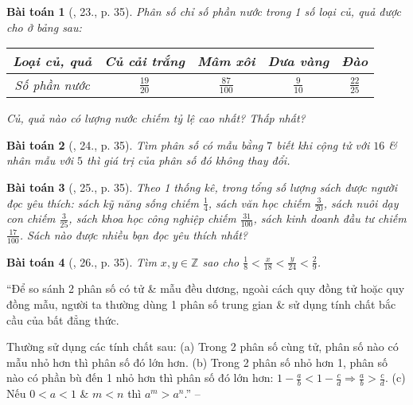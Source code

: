 \documentclass{article}
\newtheorem{baitoan}{Bài toán}
\begin{document}
\begin{baitoan}[\cite{SBT_Toan_6_Canh_Dieu_tap_2}, 23., p. 35]
	Phân số chỉ số phần nước trong 1 số loại củ, quả được cho ở bảng sau:
	\begin{table}[H]
		\centering
		\begin{tabular}{|c|c|c|c|c|}
			\hline
			Loại củ, quả & Củ cải trắng & Mâm xôi & Dưa vàng & Đào \\
			\hline
			Số phần nước & $\frac{19}{20}$ & $\frac{87}{100}$ & $\frac{9}{10}$ & $\frac{22}{25}$ \\
			\hline
		\end{tabular}
	\end{table}
	\noindent Củ, quả nào có lượng nước chiếm tỷ lệ cao nhất? Thấp nhất?
\end{baitoan}

\begin{baitoan}[\cite{SBT_Toan_6_Canh_Dieu_tap_2}, 24., p. 35]
	Tìm phân số có mẫu bằng $7$ biết khi cộng tử với $16$ \& nhân mẫu với $5$ thì giá trị của phân số đó không thay đổi.
\end{baitoan}

\begin{baitoan}[\cite{SBT_Toan_6_Canh_Dieu_tap_2}, 25., p. 35]
	Theo 1 thống kê, trong tổng số lượng sách được người đọc yêu thích: sách kỹ năng sống chiếm $\frac{1}{4}$, sách văn học chiếm $\frac{3}{20}$, sách nuôi dạy con chiếm $\frac{3}{25}$, sách khoa học công nghiệp chiếm $\frac{31}{100}$, sách kinh doanh đầu tư chiếm $\frac{17}{100}$. Sách nào được nhiều bạn đọc yêu thích nhất?
\end{baitoan}

\begin{baitoan}[\cite{SBT_Toan_6_Canh_Dieu_tap_2}, 26., p. 35]
	Tìm $x,y\in\mathbb{Z}$ sao cho $\frac{1}{8} < \frac{x}{18} < \frac{y}{24} < \frac{2}{9}$.
\end{baitoan}

``Để so sánh 2 phân số có tử \& mẫu đều dương, ngoài cách quy đồng tử hoặc quy đồng mẫu, người ta thường dùng 1 phân số trung gian \& sử dụng tính chất bắc cầu của bất đẳng thức.

Thường sử dụng các tính chất sau: (a) Trong 2 phân số cùng tử, phân số nào có mẫu nhỏ hơn thì phân số đó lớn hơn. (b) Trong 2 phân số nhỏ hơn 1, phân số nào có phần bù đến 1 nhỏ hơn thì phân số đó lớn hơn: $1 - \frac{a}{b} < 1 - \frac{c}{d}\Rightarrow\frac{a}{b} > \frac{c}{d}$. (c) Nếu $0 < a < 1$ \& $m < n$ thì $a^m > a^n$.'' -- \cite[Chap. 1, \S2, p. 8]{Binh_Toan_6_tap_2}
\end{document}
